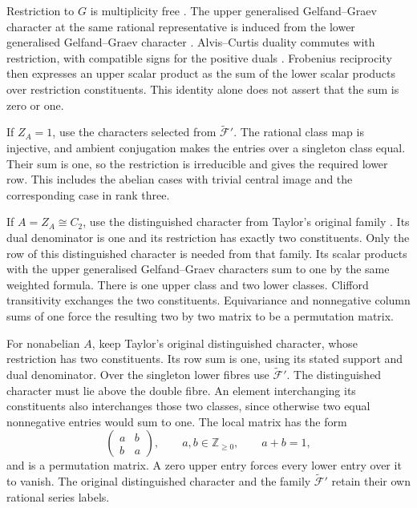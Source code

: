 Restriction to $G$ is multiplicity free
\cite[Theorem~1.7.15]{GeckMalle2020}. The upper generalised Gelfand--Graev character at the same
rational representative is induced from the lower generalised Gelfand--Graev character
\cite[proof of Lemma~14.12]{Taylor2016}. Alvis--Curtis duality commutes
with restriction, with compatible signs for the positive duals
\cite[Lemma~5.2 and Corollary~5.3]{Taylor2013}. Frobenius reciprocity
then expresses an upper scalar product as the sum of the lower
scalar products over restriction constituents. This identity alone
does not assert that the sum is zero or one.

If $Z_A=1$, use the characters selected from
$\widetilde{\mathcal F}'$. The rational class map is injective,
and ambient conjugation makes the entries
over a singleton class equal. Their sum is one, so the restriction
is irreducible and gives the required lower row. This includes the
abelian cases with trivial central image and the corresponding case
in rank three.

If $A=Z_A\cong C_2$, use the distinguished character from Taylor's
original family \cite[Theorem~3.2]{Taylor2013}. Its dual denominator
is one and its restriction has exactly two constituents. Only the
row of this distinguished character is needed from that family.
Its scalar products with the upper generalised Gelfand--Graev characters sum to one by the same
weighted formula. There is one upper class and two lower classes.
Clifford transitivity exchanges the two constituents. Equivariance
and nonnegative column sums of one force the resulting two by two
matrix to be a permutation matrix.

For nonabelian $A$, keep Taylor's original distinguished character,
whose restriction has two constituents. Its row sum is one, using
its stated support and dual denominator. Over the singleton lower
fibres use $\widetilde{\mathcal F}'$. The distinguished character must
lie above the double fibre. An element interchanging its constituents
also interchanges those two classes, since otherwise two equal
nonnegative entries would sum to one. The local matrix has the form
\[
 \begin{pmatrix}a&b\\b&a\end{pmatrix},
 \qquad a,b\in\mathbb Z_{\geq0},\qquad a+b=1,
\]
and is a permutation matrix. A zero upper entry forces every lower
entry over it to vanish. The original distinguished character and
the family $\widetilde{\mathcal F}'$ retain their own rational series labels.


